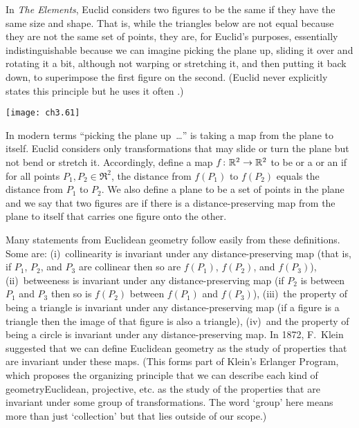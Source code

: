 In \emph{The Elements}, Euclid considers two figures to be
the same if they have the same size and shape.
That is, while the triangles below are not equal because they are not the same 
set of points,
they are, for Euclid's purposes, essentially 
indistinguishable
because we can imagine 
picking the plane up,
sliding it over and rotating it a bit,
although not warping or stretching it,    
and then putting it back down, to superimpose the first figure on
the second.
(Euclid never explicitly states this principle 
but he uses it often \cite{Casey}.)
\begin{center}
  \texttt{[image: ch3.61]}
\end{center}
In modern terms ``picking the plane up~\ldots'' 
is taking a
map from the plane to itself. 
Euclid considers only transformations 
that may slide or turn the plane but not bend or stretch it.
Accordingly, define a map $\mbox{$f\colon \mathbb{R}^2\to \mathbb{R}^2$}$ to be 
%
or a  or an
if for all points $P_1,P_2\in\Re^2$,
the distance from $f(P_1)$ to $f(P_2)$ equals the distance from
$P_1$ to $P_2$. 
We also define a plane  
to be a set of points in the plane
and we say that two figures are 
%
 if there is a 
distance-preserving map from the plane to itself that carries one figure 
onto the other.

Many statements from Euclidean geometry 
follow easily from these definitions.
Some are: (i)~collinearity is invariant under any distance-preserving map
(that is, if $P_1$, $P_2$, and $P_3$ are collinear then so are
$f(P_1)$, $f(P_2)$, and $f(P_3)$),
(ii)~betweeness is invariant under any distance-preserving map
(if $P_2$ is between $P_1$ and $P_3$ then so is
$f(P_2)$ between $f(P_1)$ and $f(P_3)$),
(iii)~the property of being a triangle is invariant under 
any distance-preserving map 
(if a figure is a triangle then the image of that figure is also a triangle),
(iv)~and the property of being a circle is invariant under any
distance-preserving map.
In 1872, F.~Klein suggested that we can define 
Euclidean geometry as the study of properties that
are invariant under these maps.
(This forms part of Klein's Erlanger Program, 
which proposes the organizing principle that we can describe each kind of 
geometry\Dash Euclidean, projective, etc.\Dash 
as the study of the properties that are
invariant under some group of transformations.
The word `group' here means more than just `collection' 
but that lies outside of our scope.)

